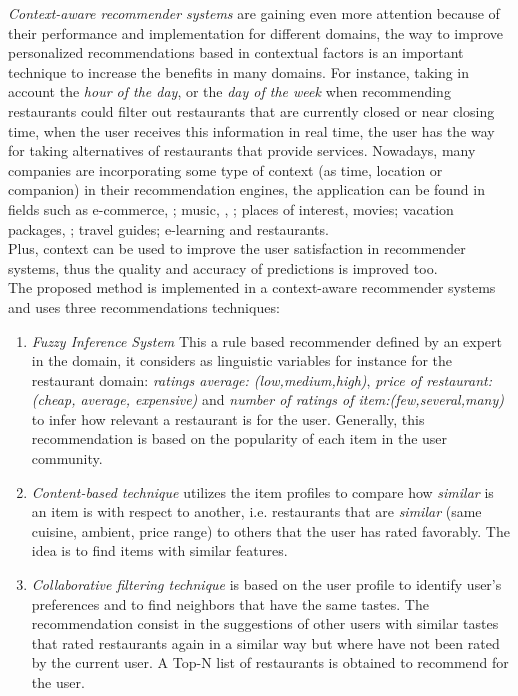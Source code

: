 \textit{Context-aware recommender systems} are gaining even more
attention because of their performance and implementation for
different domains, the  way to improve personalized recommendations
based in contextual factors is an important technique to increase the
benefits in  many domains. For instance, taking in account the
\textit{hour of the day},  or the \textit{day of the week} when
recommending restaurants could  filter out restaurants that are
currently closed or near closing time, when the user receives this
information in real time, the user has the  way for taking
alternatives of restaurants that provide services. Nowadays, many
companies are incorporating some type of context (as time, location or
companion) in their recommendation engines,  the application can be
found in fields such as e-commerce\cite{schafer1999recommender},
\cite{bulander2005enabling}; music\cite{ricci2012context}, 
\cite{baltrunas2011incarmusic}, \cite{huq2010automated}; 
places of interest\cite{baltrunas2012context},
movies\cite{eyjolfsdottir2010moviegen}; vacation
packages\cite{liu2011personalized}, \cite{liu2014cocktail}; 
travel guides\cite{savage2012m}; e-learning\cite{ortigosa2010entornos} 
and restaurants\cite{chu2013chinese}.\\
Plus, context can be used to improve the user satisfaction  in
recommender systems, thus the quality and accuracy of predictions  
is improved too.\\
The proposed method is implemented in a context-aware 
recommender systems and uses three recommendations techniques:
\begin{enumerate} 
\item \textit{Fuzzy Inference System} This a rule based recommender
defined by an expert in the domain, it considers as linguistic
variables for instance for the restaurant domain: \textit{ratings
average: (low,medium,high)}, \textit{price of restaurant:(cheap,
average, expensive)} and \textit{number of ratings of
item:(few,several,many)} to infer how relevant a restaurant is for the
user. Generally, this recommendation is based on the popularity of
each item in the user community.
\item \textit{Content-based technique} utilizes the item profiles 
to compare how \textit{similar} is an item is with respect to 
another, i.e. restaurants that are \textit{similar} (same cuisine, 
ambient, price range)  to others that the user has rated favorably. 
The idea is to find items with similar features. 
\item \textit{Collaborative filtering technique} is based on the user
profile to identify user's preferences and to find neighbors that
have the same tastes. The recommendation consist in the suggestions of
other users with similar tastes that rated restaurants again in a
similar way but where have not been rated by the current user. A Top-N
list of restaurants is obtained to recommend for the user.
\end{enumerate} 
